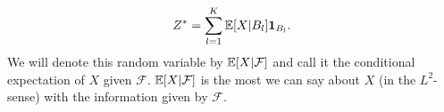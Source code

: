 \begin{align}\label{cd1}
	Z^*=\sum_{l=1}^K \mathbb{E}[X| B_l] \mathbf 1_{B_l}.
\end{align} 
We will denote this random variable by $\mathbb{E}[X| \mathcal F]$ and call it the conditional expectation of $X$ given $\mathcal F$. $\mathbb{E}[X|\mathcal F]$ is the most we can say about $X$ (in the $L^2$-sense) with the information given by $\mathcal F$.

